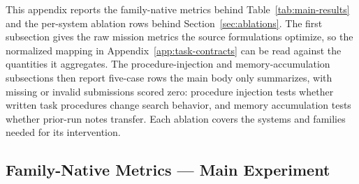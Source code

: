 \documentclass[11pt]{article}
\begin{document}
This appendix reports the family-native metrics behind Table~\ref{tab:main-results} and the per-system ablation rows behind Section~\ref{sec:ablations}. The first subsection gives the raw mission metrics the source formulations optimize, so the normalized mapping in Appendix~\ref{app:task-contracts} can be read against the quantities it aggregates. The procedure-injection and memory-accumulation subsections then report five-case rows the main body only summarizes, with missing or invalid submissions scored zero: procedure injection tests whether written task procedures change search behavior, and memory accumulation tests whether prior-run notes transfer. Each ablation covers the systems and families needed for its intervention.

\subsection{Family-Native Metrics --- Main Experiment}
\end{document}
